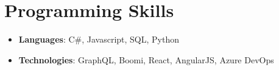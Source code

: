 \documentclass[letterpaper,11pt]{article}
\newcommand{\resumeItem}[2]{
  \item\small{
    \textbf{#1}{: #2 \vspace{-2pt}}
  }
}
\newcommand{\resumeSubItem}[2]{\resumeItem{#1}{#2}\vspace{-4pt}}
\newcommand{\resumeSubHeadingListStart}{\begin{itemize}[leftmargin=*]}
\newcommand{\resumeSubHeadingListEnd}{\end{itemize}}
\begin{document}
%
\section{Programming Skills}
  \resumeSubHeadingListStart
    \resumeSubItem{Languages}
      {C\#, Javascript, SQL, Python}
    \resumeSubItem{Technologies}
      {GraphQL, Boomi, React, AngularJS, Azure DevOps}
  \resumeSubHeadingListEnd


\end{document}
